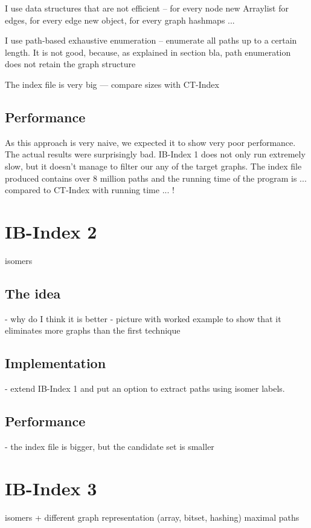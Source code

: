 \documentclass{l4proj}
\theoremstyle{definition}
\begin{document}
            I use data structures that are not efficient -- for every node new Arraylist for edges, for every edge new object, for every graph hashmaps ...
            
            I use path-based exhaustive enumeration -- enumerate all paths up to a certain length. It is not good, because, as explained in section bla, path enumeration does not retain the graph structure
            
            The index file is very big --- compare sizes with CT-Index
\subsection{Performance}
  As this approach is very naive, we expected it to show very poor performance. The actual results were surprisingly bad. IB-Index 1 does not only run extremely slow, but it doesn't manage to filter our any of the target graphs. The index file produced contains over 8 million paths and the running time of the program is ... compared to CT-Index with running time ... !
            
\section{IB-Index 2}    
  isomers
\subsection{The idea}
        - why do I think it is better
        - picture with worked example to show that it eliminates more graphs than the first technique
       
       \subsection{Implementation}
       
       - extend IB-Index 1 and put an option to extract paths using isomer labels.
       
        \subsection{Performance}
        - the index file is bigger, but the candidate set is smaller
        
        \section{IB-Index 3}
        isomers + different graph representation (array, bitset, hashing)
        maximal paths
        
\end{document}

